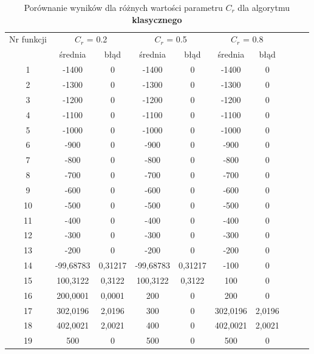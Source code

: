 \documentclass[a4paper,12pt]{article}
\theoremstyle{definition}
\begin{document}
\begin{table}[H]
\centering
\def\arraystretch{1.3}
\setlength\tabcolsep{10pt}
\caption{Porównanie wyników dla różnych wartości parametru $C_r$ dla algorytmu \textbf{klasycznego}}
\vspace{8pt}
\begin{tabular}{|c|c|c|c|c|c|c|c|c|c|}
	
	\hline
	\multirow{2}{*}{Nr funkcji} & \multicolumn{2}{c|}{$C_r$ = 0.2} & \multicolumn{2}{c|}{$C_r$ = 0.5} & \multicolumn{2}{c|}{$C_r$ = 0.8}\\
	\cline{2-7}
	& średnia & błąd & średnia & błąd & średnia & błąd \\\hline
	1     & -1400 & 0     & -1400 & 0     & -1400 & 0 \\\hline
    2     & -1300 & 0     & -1300 & 0     & -1300 & 0 \\\hline
    3     & -1200 & 0     & -1200 & 0     & -1200 & 0 \\\hline
    4     & -1100 & 0     & -1100 & 0     & -1100 & 0 \\\hline
    5     & -1000 & 0     & -1000 & 0     & -1000 & 0 \\\hline
    6     & -900  & 0     & -900  & 0     & -900  & 0 \\\hline
    7     & -800  & 0     & -800  & 0     & -800  & 0 \\\hline
    8     & -700  & 0     & -700  & 0     & -700  & 0 \\\hline
    9     & -600  & 0     & -600  & 0     & -600  & 0 \\\hline
    10    & -500  & 0     & -500  & 0     & -500  & 0 \\\hline
    11    & -400  & 0     & -400  & 0     & -400  & 0 \\\hline
    12    & -300  & 0     & -300  & 0     & -300  & 0 \\\hline
    13    & -200  & 0     & -200  & 0     & -200  & 0 \\\hline
    14    & -99,68783 & 0,31217 & -99,68783 & 0,31217 & -100  & 0 \\\hline
    15    & 100,3122 & 0,3122 & 100,3122 & 0,3122 & 100   & 0 \\\hline
    16    & 200,0001 & 0,0001 & 200   & 0     & 200   & 0 \\\hline
    17    & 302,0196 & 2,0196 & 300   & 0     & 302,0196 & 2,0196 \\\hline
    18    & 402,0021 & 2,0021 & 400   & 0     & 402,0021 & 2,0021 \\\hline
    19    & 500   & 0     & 500   & 0     & 500   & 0 \\\hline

\end{tabular}
\end{table}
\end{document}
